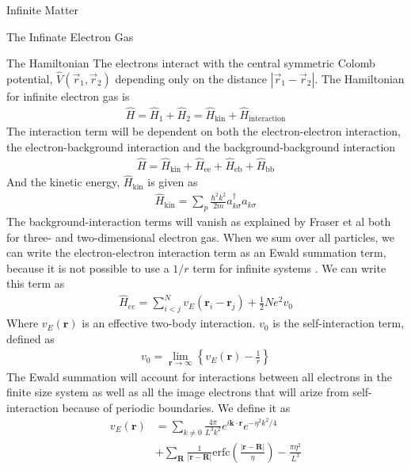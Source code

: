 \documentclass[twoside,english]{uiofysmaster}
\begin{document}
\begin{chapter}{Infinite Matter}
\begin{section}{The Infinate Electron Gas}
		\begin{subsection}{The Hamiltonian}
			The electrons interact with the central symmetric Colomb potential, $\hat V(\vec r_1, \vec r_2)$ depending only on the distance $\left| \vec r_1 - \vec r_2 \right|$. The Hamiltonian for infinite electron gas is \cite{Baardsen}
			\begin{align}
				\hat H = \hat H_1 + \hat H_2 = \hat H_{\text{kin}} + \hat H_{\text{interaction}}
			\end{align}
			The interaction term will be dependent on both the electron-electron interaction, the electron-background interaction and the background-background interaction
			\begin{align}
				\hat H = \hat H_{\text{kin}} + \hat H_{\text{ee}} + \hat H_{\text{eb}} + \hat H_{\text{bb}}
			\end{align}
			And the kinetic energy, $\hat H_{\text{kin}}$ is given as
			\begin{align}
				\hat H_{\text{kin}} = \sum_p \frac{\hbar ^2 k^2}{2m} a_{k \sigma}^{\dagger} a_{k \sigma}
			\end{align}
			The background-interaction terms will vanish as explained by Fraser et al \cite{Fraser et al} both for three- and two-dimensional electron gas. When we sum over all particles, we can write the electron-electron interaction term as an Ewald summation term, because it is not possible to use a $1/r$ term for infinite systems \cite{Drummond2008} \cite{MHJonline}. We can write this term as
			\begin{align}
				\hat H_{ee} = \sum_{i<j}^N v_E(\mathbf{r}_i - \mathbf{r}_j) + \frac{1}{2}Ne^2v_0
			\end{align}
			Where $v_E(\mathbf{r})$ is an effective two-body interaction. $v_0$ is the self-interaction term, defined as 
			\begin{align}
				v_0 = \lim_{\mathbf{r}\rightarrow \infty} \left\{ v_E(\mathbf{r}) - \frac{1}{r} \right\}
			\end{align}
			The Ewald summation will account for interactions between all electrons in the finite size system as well as all the image electrons that will arize from self-interaction because of periodic boundaries. We define it as 
			\begin{align}
				v_E(\mathbf{r}) &= \sum_{k \neq 0} \frac{4\pi}{L^3k^2} e^{i \mathbf{k}\cdot \mathbf{r} } e^{-\eta^2 k^2 / 4} \\
								&+ \sum_{\mathbf{R}} \frac{1}{|	\mathbf{r} - \mathbf{R}|} \text{erfc} \left( \frac{| \mathbf{r} - \mathbf{R}|}{\eta} \right) - \frac{\pi \eta^2}{L^3}

\end{align}
\end{subsection}
\end{section}
\end{chapter}
\end{document}
